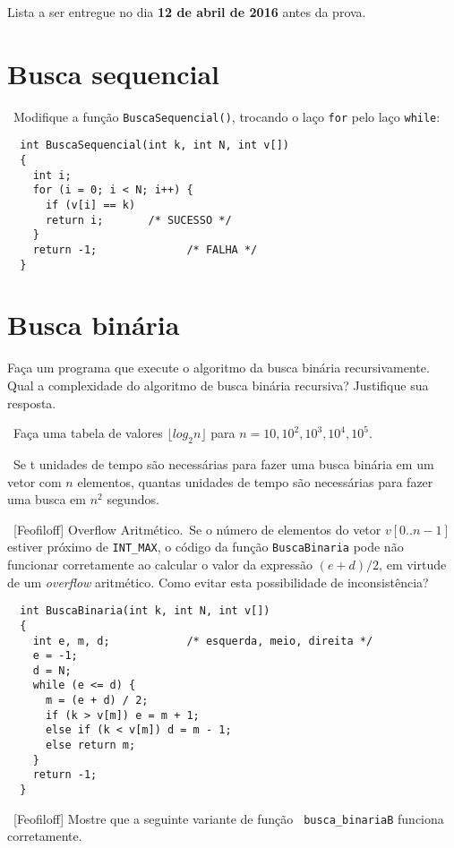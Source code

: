 
\noindent Lista a ser entregue no dia {\bf 12 de abril de 2016} antes da prova.

\section*{Busca sequencial}


\exercise~Modifique a função {\tt BuscaSequencial()}, trocando o laço
{\tt for} pelo laço {\tt while}:

\begin{lstlisting}
  int BuscaSequencial(int k, int N, int v[])
  {
    int i;
    for (i = 0; i < N; i++) { 
      if (v[i] == k) 
      return i;       /* SUCESSO */  
    }                                
    return -1;              /* FALHA */
  }  
\end{lstlisting}


\section*{Busca binária}

\exercise Faça um programa que execute o algoritmo da busca binária
recursivamente. Qual a complexidade do algoritmo de busca binária
recursiva? Justifique sua resposta.

\exercise~Faça uma tabela de valores $\lfloor log_2n \rfloor$ para
$n=10, 10^2, 10^3, 10^4, 10^5$.

\exercise~Se t unidades de tempo são necessárias para fazer uma busca
binária em um vetor com $n$ elementos, quantas unidades de tempo são
necessárias para fazer uma busca em $n^2$ segundos.

\exercise~[Feofiloff] {\sc Overflow Aritmético.}~Se o número de
elementos do vetor $v[0..n-1]$ estiver próximo de {\tt INT\_MAX}, o
código da função {\tt BuscaBinaria} pode não funcionar corretamente
ao calcular o valor da expressão $(e+d)/2$, em virtude de um {\it
  overflow\/} aritmético. Como evitar esta possibilidade de
inconsistência?

\begin{lstlisting}
  int BuscaBinaria(int k, int N, int v[])
  {
    int e, m, d;            /* esquerda, meio, direita */
    e = -1;
    d = N;
    while (e <= d) {
      m = (e + d) / 2;
      if (k > v[m]) e = m + 1;
      else if (k < v[m]) d = m - 1;
      else return m;
    }
    return -1;
  }
\end{lstlisting}

\pagebreak
\exercise~[Feofiloff] Mostre que a seguinte variante de função {\tt
  busca\_binariaB} funciona corretamente.

